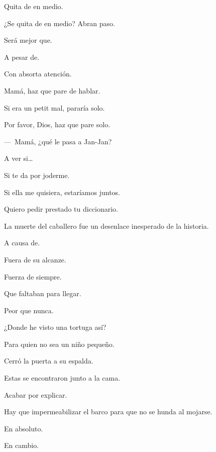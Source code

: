 \sk
Quita de en medio. 

\sk
¿Se quita de en medio? Abran paso. 

\sk
Será mejor que. 

\sk
A pesar de. 

\sk
Con absorta atención. 

\sk
Mamá, haz que pare de hablar. 

\sk
Si era un petit mal, pararía solo. 

\sk
Por favor, Dios, haz que pare solo. 

\sk
---~Mamá, ¿qué le pasa a Jan-Jan? 

\sk
A ver si\ldots{} 

\sk
Si te da por joderme. \nb{}

\sk
Si ella me quisiera, estaríamos juntos. \nb{}

\sk
Quiero pedir prestado tu diccionario. \nb{}

\sk
La muerte del caballero fue un desenlace inesperado de la historia. \nb{}

\sk
A causa de. 

\sk
Fuera de su alcanze. 

\sk
Fuerza de siempre. 

\sk
Que faltaban para llegar. 

\sk
Peor que nunca. 

\sk
¿Donde he visto una tortuga así? 

\sk
Para quien no sea un niño pequeño. 

\sk
Cerró la puerta a su espalda. 

\sk
Estas se encontraron junto a la cama. 

\sk
Acabar por explicar. 

\sk
Hay que impermeabilizar el barco para que no se hunda al mojarse. 

\sk
En absoluto. 

\sk
En cambio. 

